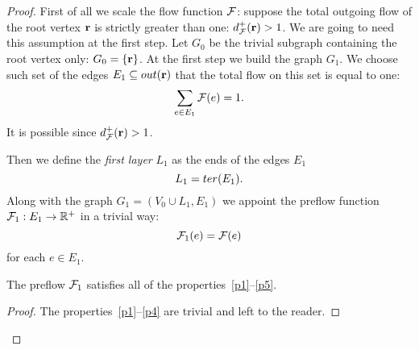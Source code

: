 \documentclass[12pt]{amsart}
\begin{document}
\begin{proof}
      First of all we scale the flow function $\mathcal{F}$: suppose the total outgoing flow of the root vertex $\mathbf{r}$ is strictly greater than one:
        $d^{+}_{\mathcal{F}}(\mathbf{r}) > 1$.
      We are going to need this assumption at the first step.
      Let $G_0$ be the trivial subgraph containing the root vertex only: $G_0 = \left\{\mathbf{r}\right\}$.
      At the first step we build the graph $G_1$.
      We choose such set of the edges $E_1 \subseteq out(\mathbf{r})$ that the total flow on this set is equal to one:
      \[
        \sum_{e \in E_1} \mathcal{F}(e) = 1.
      \]
      It is possible since $d^{+}_{\mathcal{F}}(\mathbf{r}) > 1$.

      Then we define the \emph{first layer} $L_1$ as the ends of the edges $E_1$
      \[
        L_1 = ter(E_1).
      \]
      Along with the graph $G_1 = (V_0 \cup L_1, E_1)$ we appoint the preflow function $\mathcal{F}_{1}: E_1 \to \mathbb{R}^{+}$ in a trivial way:
      \[
        \mathcal{F}_{1}(e) = \mathcal{F}(e)
      \]
        for each $e \in E_1$.
      \begin{prop}
        The preflow $\mathcal{F}_{1}$ satisfies all of the properties~\ref{p1}--\ref{p5}.
      \end{prop}
      \begin{proof}
        The properties~\ref{p1}--\ref{p4} are trivial and left to the reader.


\end{proof}
\end{proof}
\end{document}
